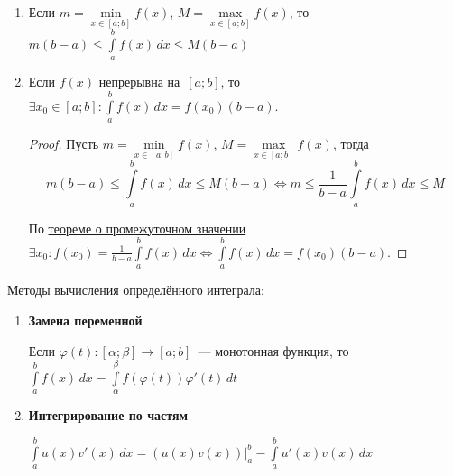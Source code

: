 \begin{enumerate}
	\item \label{st:inequality_of_Riemann_integral}
	Если $m = \min\limits_{x \in [a; b]} f(x)$, $M = \max\limits_{x \in [a; b]} f(x)$, то $m(b - a) \leqslant \int\limits_a^b f(x)\,dx \leqslant M(b - a)$
	
	\item {}
	\begin{theorem}[о среднем]
	Если $f(x)$ непрерывна на~$[a; b]$, то $\exists x_0 \in [a; b] \colon \int\limits_a^b f(x)\,dx = f(x_0)(b - a)$.
	\end{theorem}
	\begin{proof}
	Пусть $m = \min\limits_{x \in [a; b]} f(x)$, $M = \max\limits_{x \in [a; b]} f(x)$, тогда
	\begin{equation*}
	m(b - a) \leqslant \int\limits_a^b f(x)\,dx \leqslant M(b - a) \Leftrightarrow
	m \leqslant \frac1{b - a} \int\limits_a^b f(x)\,dx \leqslant M
	\end{equation*}
	
	По \hyperref[th:intermediate_value]{теореме о промежуточном значении}
	$\exists x_0 \colon f(x_0) = \frac1{b - a} \int\limits_a^b f(x)\,dx \Leftrightarrow
	\int\limits_a^b f(x)\,dx = f(x_0)(b - a)$.
	\end{proof}
\end{enumerate}

Методы вычисления определённого интеграла:
\begin{enumerate}
	\item {} \textbf{Замена переменной}
	
	Если $\varphi(t) \colon [\alpha; \beta] \to [a; b]$~--- монотонная функция, то $\int\limits_a^b f(x)\,dx =
	\int\limits_\alpha^\beta f(\varphi(t)) \varphi'(t)\,dt$
	
	\item {} \textbf{Интегрирование по частям}
	
	$\int\limits_a^b u(x) v'(x)\,dx = \left. (u(x) v(x)) \right|_a^b - \int\limits_a^b u'(x) v(x)\,dx$
\end{enumerate}

